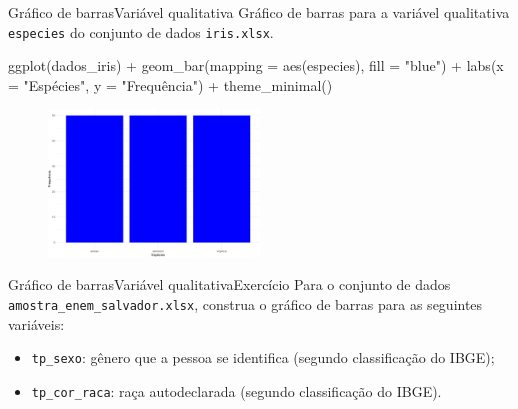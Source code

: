 \documentclass[
  10pt,
  ignorenonframetext,
]{beamer}
\newenvironment{Shaded}{\begin{snugshade}}{\end{snugshade}}
\newcommand{\AttributeTok}[1]{\textcolor[rgb]{0.40,0.45,0.13}{#1}}
\newcommand{\FunctionTok}[1]{\textcolor[rgb]{0.28,0.35,0.67}{#1}}
\newcommand{\NormalTok}[1]{\textcolor[rgb]{0.00,0.23,0.31}{#1}}
\newcommand{\SpecialCharTok}[1]{\textcolor[rgb]{0.37,0.37,0.37}{#1}}
\newcommand{\StringTok}[1]{\textcolor[rgb]{0.13,0.47,0.30}{#1}}
\providecommand{\tightlist}{%
  \setlength{\itemsep}{0pt}\setlength{\parskip}{0pt}}\usepackage{longtable,booktabs,array}
\begin{document}
\begin{frame}[fragile]{Gráfico de barras\newline Variável qualitativa}
\protect\hypertarget{gruxe1fico-de-barrasvariuxe1vel-qualitativa}{}
Gráfico de barras para a variável qualitativa \texttt{especies} do
conjunto de dados \texttt{iris.xlsx}.

\begin{Shaded}
\begin{Highlighting}[]
\FunctionTok{ggplot}\NormalTok{(dados\_iris) }\SpecialCharTok{+}
  \FunctionTok{geom\_bar}\NormalTok{(}\AttributeTok{mapping =} \FunctionTok{aes}\NormalTok{(especies), }\AttributeTok{fill =} \StringTok{"blue"}\NormalTok{) }\SpecialCharTok{+}
  \FunctionTok{labs}\NormalTok{(}\AttributeTok{x =} \StringTok{"Espécies"}\NormalTok{, }\AttributeTok{y =} \StringTok{"Frequência"}\NormalTok{) }\SpecialCharTok{+}
  \FunctionTok{theme\_minimal}\NormalTok{()}
\end{Highlighting}
\end{Shaded}

\begin{figure}

{\centering \includegraphics[width=0.5\textwidth,height=\textheight]{exploracao-visualizacao_files/figure-beamer/unnamed-chunk-65-1.pdf}

}

\end{figure}
\end{frame}

\begin{frame}[fragile]{Gráfico de barras\newline Variável
qualitativa\newline Exercício}
\protect\hypertarget{gruxe1fico-de-barrasvariuxe1vel-qualitativaexercuxedcio}{}
Para o conjunto de dados \texttt{amostra\_enem\_salvador.xlsx}, construa
o gráfico de barras para as seguintes variáveis:

\begin{itemize}
\tightlist
\item
  \texttt{tp\_sexo}: gênero que a pessoa se identifica (segundo
  classificação do IBGE);
\item
  \texttt{tp\_cor\_raca}: raça autodeclarada (segundo classificação do
  IBGE).
\end{itemize}
\end{frame}
\end{document}
